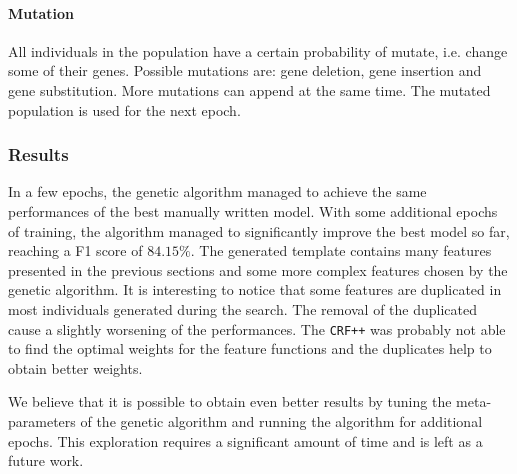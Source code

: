 \paragraph{Mutation}
All individuals in the population have a certain probability of mutate, i.e. change some of their genes.
Possible mutations are: gene deletion, gene insertion and gene substitution.
More mutations can append at the same time.
The mutated population is used for the next epoch.

\subsubsection{Results}
In a few epochs, the genetic algorithm managed to achieve the same performances of the best manually written model.
With some additional epochs of training, the algorithm managed to significantly improve the best model so far, reaching a F1 score of $84.15\%$.
The generated template contains many features presented in the previous sections and some more complex features chosen by the genetic algorithm.
It is interesting to notice that some features are duplicated in most individuals generated during the search.
The removal of the duplicated cause a slightly worsening of the performances.
The \texttt{CRF++} was probably not able to find the optimal weights for the feature functions and the duplicates help to obtain better weights.

We believe that it is possible to obtain even better results by tuning the meta-parameters of the genetic algorithm and running the algorithm for additional epochs.
This exploration requires a significant amount of time and is left as a future work.
